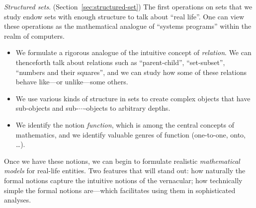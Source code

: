{\it Structured sets}. 
(Section~\ref{sec:structured-set}) The first operations on sets that
we study endow sets with enough structure to talk about ``real life''.
One can view these operations as the mathematical analogue of
``systems programs'' within the realm of computers.
\begin{itemize}
\item
We formulate a rigorous analogue of the intuitive concept of {\it
  relation}.  We can thenceforth talk about relations such as
``parent-child'', ``set-subset'', ``numbers and their squares'', and
we can study how some of these relations behave like---or
unlike---some others.
\item
We use various kinds of structure in sets to create complex objects
that have sub-objects and sub-$\cdots$-objects to arbitrary depths.
\item
We identify the notion {\it function}, which is among the central
concepts of mathematics, and we identify valuable genres of function
(one-to-one, onto, \ldots).
\end{itemize}
Once we have these notions, we can begin to formulate realistic {\it
  mathematical models} for real-life entities.  Two features that will
stand out: how naturally the formal notions capture the intuitive
notions of the vernacular; how technically simple the formal notions
are---which facilitates using them in sophisticated analyses.

\bigskip

